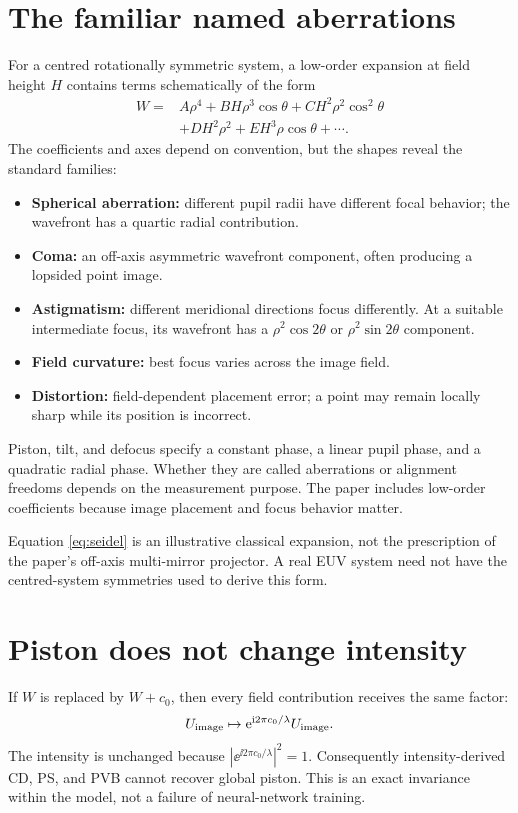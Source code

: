 \section{The familiar named aberrations}
For a centred rotationally symmetric system, a low-order expansion
at field height $H$ contains terms schematically of the form
\begin{align}
W={}&A\rho^4
+B H\rho^3\cos\theta
+C H^2\rho^2\cos^2\theta\\
&+D H^2\rho^2
+E H^3\rho\cos\theta+\cdots.
\label{eq:seidel}
\end{align}
The coefficients and axes depend on convention, but the shapes reveal
the standard families:
\begin{itemize}
\item \textbf{Spherical aberration:} different pupil radii have different
focal behavior; the wavefront has a quartic radial contribution.
\item \textbf{Coma:} an off-axis asymmetric wavefront component, often
producing a lopsided point image.
\item \textbf{Astigmatism:} different meridional directions focus differently.
At a suitable intermediate focus, its wavefront has a
$\rho^2\cos2\theta$ or $\rho^2\sin2\theta$ component.
\item \textbf{Field curvature:} best focus varies across the image field.
\item \textbf{Distortion:} field-dependent placement error; a point may
remain locally sharp while its position is incorrect.
\end{itemize}
Piston, tilt, and defocus specify a constant phase, a linear pupil phase,
and a quadratic radial phase. Whether they are called aberrations or
alignment freedoms depends on the measurement purpose. The paper includes
low-order coefficients because image placement and focus behavior matter.

Equation \eqref{eq:seidel} is an illustrative classical expansion, not the
prescription of the paper's off-axis multi-mirror projector. A real EUV
system need not have the centred-system symmetries used to derive this form.

\section{Piston does not change intensity}
If $W$ is replaced by $W+c_0$, then every field contribution receives the
same factor:
\[
U_{\rm image}\mapsto\mathrm{e}^{\mathrm{i}2\pi c_0/\lambda}U_{\rm image}.
\]
The intensity is unchanged because
$|\ee^{\ii2\pi c_0/\lambda}|^2=1$.
Consequently intensity-derived CD, PS, and PVB cannot recover global
piston. This is an exact invariance within the model, not a failure of
neural-network training.

